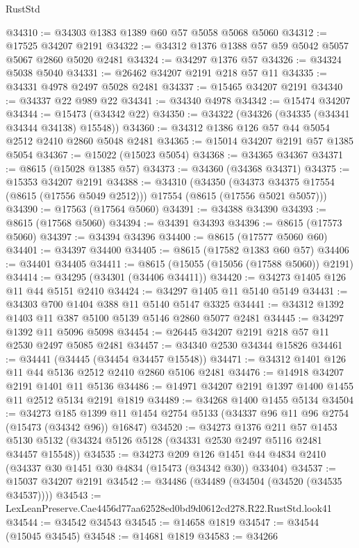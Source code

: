 \begin{lexlean}{RustStd}
\begin{coremodule}
@34310 := @34303 @1383 @1389 @60 @57 @5058 @5068 @5060
@34312 := @17525 @34207 @2191
@34322 := @34312 @1376 @1388 @57 @59 @5042 @5057 @5067 @2860 @5020 @2481
@34324 := @34297 @1376 @57
@34326 := @34324 @5038 @5040
@34331 := @26462 @34207 @2191 @218 @57 @11
@34335 := @34331 @4978 @2497 @5028 @2481
@34337 := @15465 @34207 @2191
@34340 := @34337 @22 @989 @22
@34341 := @34340 @4978
@34342 := @15474 @34207
@34344 := @15473 (@34342 @22)
@34350 := @34322 (@34326 (@34335 (@34341 @34344 @34138) @15548))
@34360 := @34312 @1386 @126 @57 @44 @5054 @2512 @2410 @2860 @5048 @2481
@34365 := @15014 @34207 @2191 @57 @1385 @5054
@34367 := @15022 (@15023 @5054)
@34368 := @34365 @34367
@34371 := @8615 (@15028 @1385 @57)
@34373 := @34360 (@34368 @34371)
@34375 := @15353 @34207 @2191
@34388 := @34310
    (@34350 (@34373 @34375 @17554 (@8615 (@17556 @5049 @2512))) @17554 (@8615 (@17556 @5021 @5057)))
@34390 := @17563 (@17564 @5060)
@34391 := @34388 @34390
@34393 := @8615 (@17568 @5060)
@34394 := @34391 @34393
@34396 := @8615 (@17573 @5060)
@34397 := @34394 @34396
@34400 := @8615 (@17577 @5060 @60)
@34401 := @34397 @34400
@34405 := @8615 (@17582 @1383 @60 @57)
@34406 := @34401 @34405
@34411 := @8615 (@15055 (@15056 (@17588 @5060)) @2191)
@34414 := @34295 (@34301 (@34406 @34411))
@34420 := @34273 @1405 @126 @11 @44 @5151 @2410
@34424 := @34297 @1405 @11 @5140 @5149
@34431 := @34303 @700 @1404 @388 @11 @5140 @5147 @3325
@34441 := @34312 @1392 @1403 @11 @387 @5100 @5139 @5146 @2860 @5077 @2481
@34445 := @34297 @1392 @11 @5096 @5098
@34454 := @26445 @34207 @2191 @218 @57 @11 @2530 @2497 @5085 @2481
@34457 := @34340 @2530 @34344 @15826
@34461 := @34441 (@34445 (@34454 @34457 @15548))
@34471 := @34312 @1401 @126 @11 @44 @5136 @2512 @2410 @2860 @5106 @2481
@34476 := @14918 @34207 @2191 @1401 @11 @5136
@34486 := @14971 @34207 @2191 @1397 @1400 @1455 @11 @2512 @5134 @2191 @1819
@34489 := @34268 @1400 @1455 @5134
@34504 := @34273
    @185
    @1399
    @11
    @1454
    @2754
    @5133
    (@34337 @96 @11 @96 @2754 (@15473 (@34342 @96)) @16847)
@34520 := @34273
    @1376
    @211
    @57
    @1453
    @5130
    @5132
    (@34324 @5126 @5128 (@34331 @2530 @2497 @5116 @2481 @34457 @15548))
@34535 := @34273
    @209
    @126
    @1451
    @44
    @4834
    @2410
    (@34337 @30 @1451 @30 @4834 (@15473 (@34342 @30)) @33404)
@34537 := @15037 @34207 @2191
@34542 := @34486 (@34489 (@34504 (@34520 (@34535 @34537))))
@34543 := LexLeanPreserve.Cae4456d77aa62528ed0bd9d0612cd278.R22.RustStd.look41
@34544 := @34542 @34543
@34545 := @14658 @1819
@34547 := @34544 (@15045 @34545)
@34548 := @14681 @1819
@34583 := @34266

\end{coremodule}
\end{lexlean}
